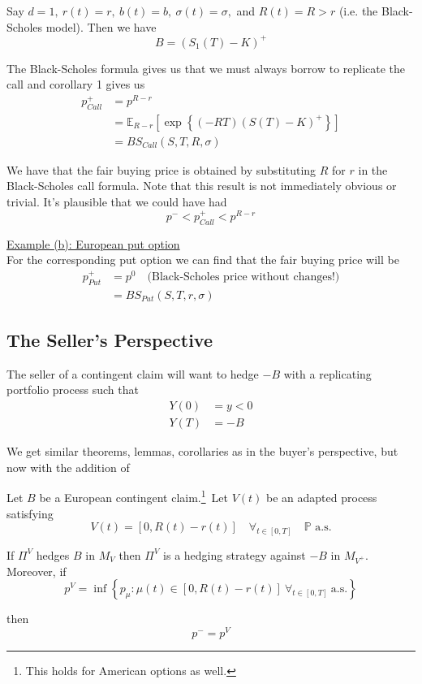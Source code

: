 \documentclass[12pt]{article}
\newenvironment{theorem}[2][Theorem:]{\begin{trivlist} %
\item[\hskip \labelsep {\bfseries #1}\hskip \labelsep {\bfseries #2.}]}{\end{trivlist}}
\newlength\tindent
\renewcommand{\indent}{\hspace*{\tindent}}
\renewcommand{\P}{\mathbb P}
\newcommand{\E}{\mathbb E}
\begin{document}
\indent Say $d = 1,~r(t) = r,~b(t) = b,~\sigma(t) = \sigma,$ and $R(t) = R > r$ (i.e. the Black-Scholes model). Then we have
\begin{equation*}
	B = (S_1(T) - K)^+
\end{equation*}

\indent The Black-Scholes formula gives us that we must always borrow to replicate the call and corollary 1 gives us
\begin{align*}
	p^+_{Call} &= p^{R - r} \\
	&= \E_{R - r} \left[ \exp \left\{ (-RT)(S(T) - K)^+ \right\} \right] \\
	&= BS_{Call}(S, T, R, \sigma)
\end{align*}

\indent We have that the fair buying price is obtained by substituting $R$ for $r$ in the Black-Scholes call formula. Note that this result is not immediately obvious or trivial. It's plausible that we could have had
\begin{equation*}
	p^- < p^+_{Call} < p^{R - r}
\end{equation*}

\underline{Example (b): European put option} \\

For the corresponding put option we can find that the fair buying price will be
\begin{align*}
	p^+_{Put} &= p^0 \quad \text{(Black-Scholes price without changes!)} \\
	&= BS_{Put}(S, T, r, \sigma)
\end{align*}


\subsection{The Seller's Perspective}

\indent The seller of a contingent claim will want to hedge $-B$ with a replicating portfolio process such that
\begin{align*}
	Y(0) &= y < 0 \\
	Y(T) &= -B
\end{align*}

We get similar theorems, lemmas, corollaries as in the buyer's perspective, but now with the addition of
\begin{theorem}{} Let $B$ be a European contingent claim.\footnote{This holds for American options as well.}~Let $V(t)$ be an adapted process satisfying
\begin{equation*}
	V(t) = [0, R(t) - r(t)] \quad \forall_{t\in[0,T]} \quad \P \text{ a.s.}
\end{equation*}

If $\Pi^V$ hedges $B$ in $M_V$ then $\Pi^V$ is a hedging strategy against $-B$ in $M_{V^+}$. Moreover, if 
\begin{equation*}
	p^V = \inf \left\{ p_\mu: \mu(t) \in [0, R(t) - r(t)]~\forall_{t\in[0,T]}~\text{a.s.} \right\}
\end{equation*}

then
\begin{equation*}
	p^- = p^V
\end{equation*}
\end{theorem}
\end{document}
